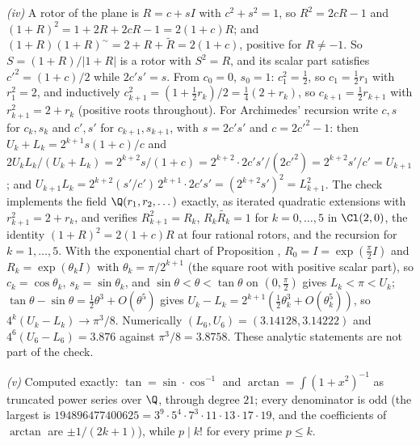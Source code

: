 \emph{(iv)} A rotor of the plane is $R = c + sI$ with $c^{2} + s^{2} = 1$, so $R^{2} = 2cR - 1$ and $(1 + R)^{2} = 1 + 2R + 2cR - 1 = 2(1 + c)R$; and $(1 + R)(1 + R)^{\sim} = 2 + R + \widetilde{R} = 2(1 + c)$, positive for $R \ne -1$. So $S = (1 + R)/\lvert 1 + R\rvert$ is a rotor with $S^{2} = R$, and its scalar part satisfies $c'^{2} = (1 + c)/2$ while $2c's' = s$. From $c_{0} = 0$, $s_{0} = 1$: $c_{1}^{2} = \tfrac12$, so $c_{1} = \tfrac12 r_{1}$ with $r_{1}^{2} = 2$, and inductively $c_{k+1}^{2} = (1 + \tfrac12 r_{k})/2 = \tfrac14(2 + r_{k})$, so $c_{k+1} = \tfrac12 r_{k+1}$ with $r_{k+1}^{2} = 2 + r_{k}$ (positive roots throughout). For Archimedes' recursion write $c, s$ for $c_{k}, s_{k}$ and $c', s'$ for $c_{k+1}, s_{k+1}$, with $s = 2c's'$ and $c = 2c'^{2} - 1$: then $U_{k} + L_{k} = 2^{k+1}s(1 + c)/c$ and $2U_{k}L_{k}/(U_{k} + L_{k}) = 2^{k+2}s/(1 + c) = 2^{k+2}\cdot 2c's'/(2c'^{2}) = 2^{k+2}s'/c' = U_{k+1}$; and $U_{k+1}L_{k} = 2^{k+2}(s'/c')\,2^{k+1}\cdot 2c's' = (2^{k+2}s')^{2} = L_{k+1}^{2}$. The check implements the field $\Q(r_{1}, r_{2}, \dots)$ exactly, as iterated quadratic extensions with $r_{k+1}^{2} = 2 + r_{k}$, and verifies $R_{k+1}^{2} = R_{k}$, $R_{k}\widetilde{R_{k}} = 1$ for $k = 0, \dots, 5$ in $\Cl(2,0)$, the identity $(1 + R)^{2} = 2(1 + c)R$ at four rational rotors, and the recursion for $k = 1, \dots, 5$. With the exponential chart of Proposition , $R_{0} = I = \exp(\tfrac{\pi}{2}I)$ and $R_{k} = \exp(\theta_{k}I)$ with $\theta_{k} = \pi/2^{k+1}$ (the square root with positive scalar part), so $c_{k} = \cos\theta_{k}$, $s_{k} = \sin\theta_{k}$, and $\sin\theta < \theta < \tan\theta$ on $(0, \tfrac{\pi}{2})$ gives $L_{k} < \pi < U_{k}$; $\tan\theta - \sin\theta = \tfrac12\theta^{3} + O(\theta^{5})$ gives $U_{k} - L_{k} = 2^{k+1}(\tfrac12\theta_{k}^{3} + O(\theta_{k}^{5}))$, so $4^{k}(U_{k} - L_{k}) \to \pi^{3}/8$. Numerically $(L_{6}, U_{6}) = (3.14128, 3.14222)$ and $4^{6}(U_{6} - L_{6}) = 3.876$ against $\pi^{3}/8 = 3.8758$. These analytic statements are not part of the check.

\emph{(v)} Computed exactly: $\tan = \sin\cdot\cos^{-1}$ and $\arctan = \int(1 + x^{2})^{-1}$ as truncated power series over $\Q$, through degree $21$; every denominator is odd (the largest is $194896477400625 = 3^{9}\cdot 5^{4}\cdot 7^{3}\cdot 11\cdot 13\cdot 17\cdot 19$, and the coefficients of $\arctan$ are $\pm 1/(2k + 1)$), while $p \mid k!$ for every prime $p \le k$.
